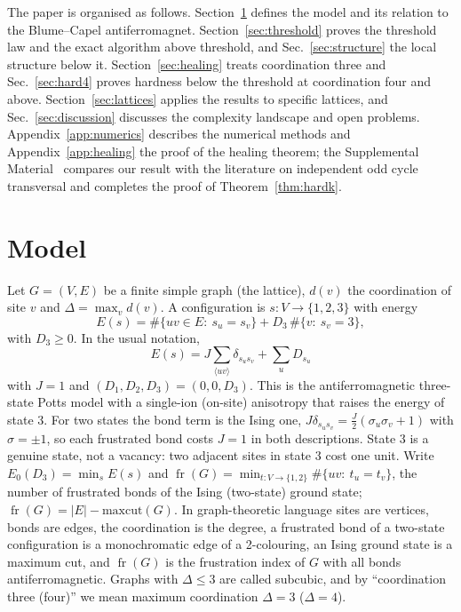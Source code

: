 \documentclass[aps,pre,twocolumn,floatfix,10pt]{revtex4-2}
\theoremstyle{definition}
\theoremstyle{remark}
\newcommand{\fr}{\operatorname{fr}}
\newcommand{\OPT}{E_0}
\begin{document}
The paper is organised as follows. Section~\ref{sec:model} defines the model and its relation to
the Blume--Capel antiferromagnet. Section~\ref{sec:threshold} proves the threshold law and the
exact algorithm above threshold, and Sec.~\ref{sec:structure} the local structure below it.
Section~\ref{sec:healing} treats coordination three and Sec.~\ref{sec:hard4} proves hardness below
the threshold at coordination four and above. Section~\ref{sec:lattices} applies the results to specific lattices, and
Sec.~\ref{sec:discussion} discusses the complexity landscape and open problems.
Appendix~\ref{app:numerics} describes the numerical methods and Appendix~\ref{app:healing} the
proof of the healing theorem; the Supplemental Material~\cite{SM} compares our result with the
literature on independent odd cycle transversal and completes the proof of Theorem~\ref{thm:hardk}.

\section{Model}
\label{sec:model}
Let $G=(V,E)$ be a finite simple graph (the lattice), $d(v)$ the coordination of site $v$ and
$\Delta=\max_v d(v)$. A configuration is $s:V\to\{1,2,3\}$ with energy
\begin{equation}
E(s)=\#\{uv\in E:\ s_u=s_v\}+D_3\,\#\{v:\ s_v=3\},
\label{eq:H}
\end{equation}
with $D_3\ge 0$. In the usual notation,
\begin{equation}
E(s)=J\sum_{\langle uv\rangle}\delta_{s_us_v}+\sum_u D_{s_u}
\label{eq:Hstd}
\end{equation}
with $J=1$ and $(D_1,D_2,D_3)=(0,0,D_3)$. This is the antiferromagnetic three-state Potts model
with a single-ion (on-site) anisotropy that raises the energy of state 3. For two states the bond term is the Ising one,
$J\delta_{s_us_v}=\tfrac J2(\sigma_u\sigma_v+1)$ with $\sigma=\pm1$, so each frustrated bond costs
$J=1$ in both descriptions.
State 3 is a genuine state, not a vacancy: two adjacent sites in state 3 cost one unit.
Write $\OPT(D_3)=\min_s E(s)$ and $\fr(G)=\min_{t:V\to\{1,2\}}\#\{uv:\ t_u=t_v\}$, the number of
frustrated bonds of the Ising (two-state) ground state; $\fr(G)=|E|-\mathrm{maxcut}(G)$.
In graph-theoretic language sites are vertices, bonds are edges, the coordination is the degree,
a frustrated bond of a two-state configuration is a monochromatic edge of a 2-colouring, an Ising
ground state is a maximum cut, and $\fr(G)$ is the frustration index of $G$ with all bonds
antiferromagnetic. Graphs with $\Delta\le3$ are called subcubic, and by ``coordination three
(four)'' we mean maximum coordination $\Delta=3$ ($\Delta=4$).
\end{document}
